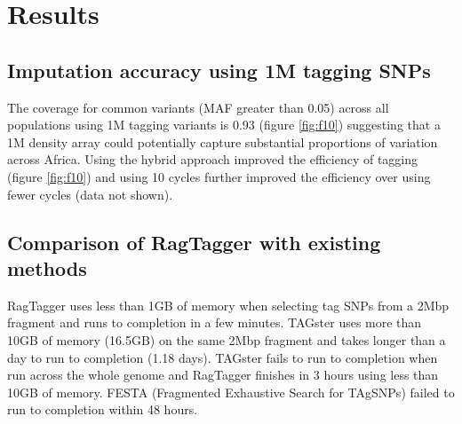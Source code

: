 \section{Results}

\subsection{Imputation accuracy using 1M tagging SNPs}
The coverage for common variants (\gls{MAF} greater than 0.05) across all populations using 1M tagging variants is 0.93 (figure \ref{fig:f10}) suggesting that a 1M density array could potentially capture substantial proportions of variation across Africa. Using the hybrid approach improved the efficiency of tagging (figure \ref{fig:f10}) and using 10 cycles further improved the efficiency over using fewer cycles (data not shown).

\subsection{Comparison of RagTagger with existing methods}
RagTagger uses less than 1GB of memory when selecting tag SNPs from a 2\gls{Mbp} fragment and runs to completion in a few minutes. TAGster\cite{Xu2007} uses more than 10GB of memory (16.5GB) on the same 2\gls{Mbp} fragment and takes longer than a day to run to completion (1.18 days). TAGster fails to run to completion when run across the whole genome and RagTagger finishes in 3 hours using less than 10GB of memory. FESTA (Fragmented Exhaustive Search for TAgSNPs)\cite{Qin15012006} failed to run to completion within 48 hours.
